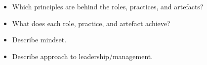 \begin{itemize}
	\item Which principles are behind the roles, practices, and artefacts?
	\item What does each role, practice, and artefact achieve?
	\item Describe mindset.
	\item Describe approach to leadership/management.
\end{itemize}







